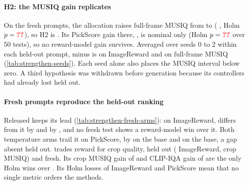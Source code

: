 \paragraph{H2: the MUSIQ gain replicates}
On the fresh prompts, the allocation raises full-frame MUSIQ from  to  ( , Holm $p=\N{st@h@p@musiq}$), so H2 is . Its PickScore gain there,  , is nominal only (Holm $p=\N{st@e@p@alloc@pick}$ over 50 tests), so no reward-model gain survives. Averaged over seeds 0 to 2 within each held-out prompt, \tempsb{} minus \segaofficial{} is   on ImageReward and   on full-frame MUSIQ (\cref{tab:strengthen-seeds}). Each seed alone also places the MUSIQ interval below zero. A third hypothesis was withdrawn before generation because its controllers had already lost held out.

\paragraph{Fresh prompts reproduce the held-out ranking}
Released \sega{} keeps its lead (\cref{tab:strengthen-fresh-arms}): on ImageReward, \ntk{} differs from it by  and \segabase{} by , and no fresh test shows a reward-model win over it. Both temperature arms trail it on PickScore, by   on the \sega{} base and   on the \ntk{} base, a gap absent held out. \dype{} trades reward for crop quality, held out ( ImageReward,  crop MUSIQ) and fresh. Its crop MUSIQ gain of   and CLIP-IQA gain of   are the only Holm wins over \segaofficial. Its Holm losses of  ImageReward and  PickScore mean that no single metric orders the methods.

